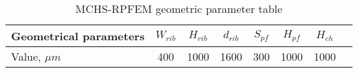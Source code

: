 \begin{table}[htbp]
    \centering
    \scriptsize
    \caption{MCHS-RPFEM geometric parameter table}
    \begin{tabular}{lccccccc}
        \toprule
        Geometrical parameters & $W_{rib}$ & $H_{rib}$ & $d_{rib}$ & $S_{pf}$ & $H_{pf}$ & $H_{ch}$ \\
        \midrule
        Value, $\mu m$         & 400       & 1000      & 1600      & 300      & 1000     & 1000     \\
        \bottomrule
    \end{tabular}
    \label{tab:structure-parameter}
\end{table}